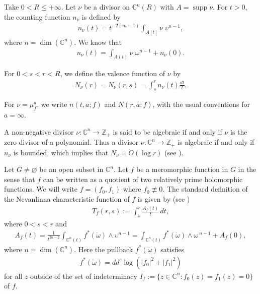 \documentclass[11pt,reqno]{amsart}
\numberwithin{equation}{section}
\begin{document}
\smallskip
Take $0<R\leq +\infty$. Let $\nu$ be a divisor on $\mathbb{C}^n(R)$ with $A=\displaystyle \operatorname{supp}\nu$. For $t>0$, the counting function $n_{\nu}$ is defined by
\begin{align*}
 \displaystyle n_{\nu}(t)=t^{-2(m-1)}\int_{A[t]}\nu\; \upsilon^{n-1},
 \end{align*}
where $n=\dim(\mathbb{C}^n)$. We know that
\begin{align*}
 \displaystyle n_{\nu}(t)=\int_{A(t)}\nu\;\omega^{n-1}+n_{\nu}(0).
 \end{align*}

For $0<s<r<R$, we define the valence function of $\nu$ by
\begin{align*}
N_{\nu}(r)=N_{\nu}(r,s)=\int_{s}^r n_{\nu}(t)\frac{dt}{t}.
\end{align*}


For $\nu=\mu_f^a$, we write $n(t,a;f)$ and $N(r,a;f)$, with the usual conventions for $a=\infty$.  


A non-negative divisor $\nu:\mathbb{C}^n\to \mathbb{Z}_+$ is said to be algebraic if and only if $\nu$ is  the zero divisor of a polynomial. Thus a divisor $\nu:\mathbb{C}^n\to \mathbb{Z}_+$ is algebraic if and only if $n_{\nu}$ is bounded, which implies that $N_{\nu}=O(\log r)$ (see \cite[pp. 19]{Stoll-1974}).

\smallskip
Let $G\neq \varnothing$ be an open subset in $\mathbb{C}^n$. Let $f$ be a meromorphic function in $G$ in the sense that $f$ can be written as a quotient of two relatively prime holomorphic functions. We will write $f = (f_0, f_1)$ where $f_0 \not\equiv 0$. The standard definition of the Nevanlinna characteristic function of $f$ is given by (see \cite[pp. 16-17]{Stoll-1974})
\begin{align*}
T_f(r,s) := \int_s^r \frac{A_f(t)}{t}\, dt,
\end{align*}
where $0 < s < r$ and
\begin{align*}
A_f(t)
= \frac{1}{t^{2n-2}} \int_{\mathbb{C}^n(t)} f^*(\ddot{\omega}) \wedge \upsilon^{n-1}
= \int_{\mathbb{C}^n(t)} f^*(\ddot{\omega}) \wedge \omega^{\,n-1} + A_f(0),
\end{align*}
where $n=\dim(\mathbb{C}^n)$.
Here the pullback $f^*(\ddot{\omega})$ satisfies
\begin{align*}
f^*(\ddot{\omega}) = dd^c \log\left( |f_0|^2 + |f_1|^2 \right)
\end{align*}
for all $z$ outside of the set of indeterminacy $I_f:= \{ z \in \mathbb{C}^n : f_0(z) = f_1(z) = 0 \}$ of $f$.
\end{document}
